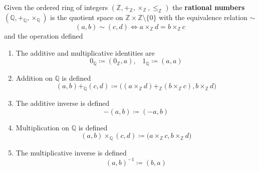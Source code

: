   \begin{definition}[Rationals]
    Given the ordered ring of integers $(\mathbb{Z}, +_{\mathbb{Z}}, \times_{\mathbb{Z}}, \leq_{\mathbb{Z}})$ the \textbf{rational numbers} $(\mathbb{Q}, +_{\mathbb{Q}}, \times_{\mathbb{Q}})$ is the quotient space on $\mathbb{Z} \times \mathbb{Z} \setminus \{0\}$ with the equivalence relation $\sim$ 
    \begin{equation}
      (a, b) \sim (c, d) \iff a \times_{\mathbb{Z}} d = b \times_{\mathbb{Z}} c
    \end{equation} 
    and the operation defined 
    \begin{enumerate}
      \item The additive and multiplicative identities are 
      \begin{equation}
        0_{\mathbb{Q}} \coloneqq (0_{\mathbb{Z}}, a), \;\;\; 1_{\mathbb{Q}} \coloneqq (a, a)
      \end{equation}

      \item Addition on $\mathbb{Q}$ is defined 
      \begin{equation}
        (a, b) +_{\mathbb{Q}} (c, d) \coloneqq \big( (a \times_{\mathbb{Z}} d) +_{\mathbb{Z}} (b \times_{\mathbb{Z}} c), b \times_{\mathbb{Z}} d \big) 
      \end{equation}

      \item The additive inverse is defined 
      \begin{equation}
        -(a, b) \coloneqq (-a, b)
      \end{equation}

      \item Multiplication on $\mathbb{Q}$ is defined 
      \begin{equation}
        (a, b) \times_{\mathbb{Q}} (c, d) \coloneqq \big( a \times_{\mathbb{Z}} c, b \times_{\mathbb{Z}} d \big)
      \end{equation} 

      \item The multiplicative inverse is defined 
      \begin{equation}
        (a, b)^{-1} \coloneqq (b, a)
      \end{equation}
    \end{enumerate}
  \end{definition}

